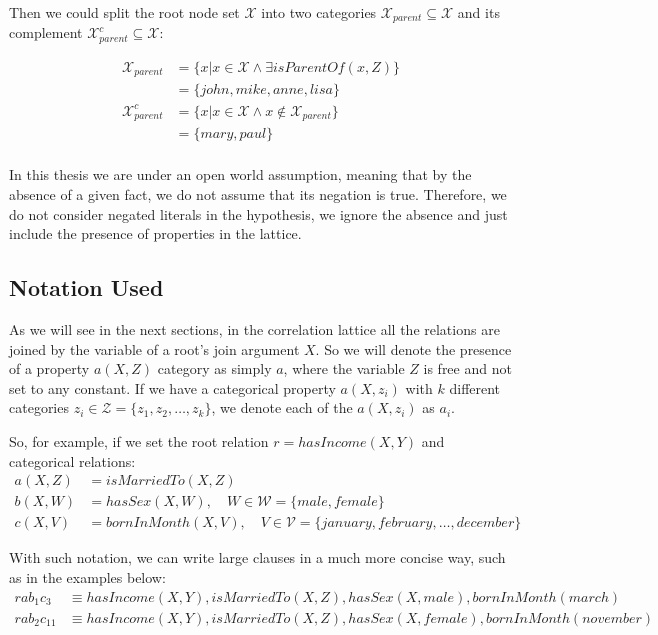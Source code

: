 Then we could split the root node set $\mathcal{X}$ into two categories $\mathcal{X}_{parent} \subseteq \mathcal{X}$
and its complement $\mathcal{X}_{parent}^{c} \subseteq \mathcal{X}$:

\begin{align*}
 \mathcal{X}_{parent}&=\{x| x \in \mathcal{X} \land \exists isParentOf(x,Z)\} \\
  &=\{john,mike,anne,lisa\} \\
 \mathcal{X}_{parent}^{c}&=\{x| x \in \mathcal{X} \land x \not \in \mathcal{X}_{parent} \} \\
  &=\{mary,paul\} \\
\end{align*}

In this thesis we are under an open world assumption, meaning that by the absence of a given fact, we do
not assume that its negation is true. Therefore, we do not consider negated literals in the hypothesis, we
ignore the absence and just include the presence of properties in the lattice.

\subsection{Notation Used}

As we will see in the next sections, in the correlation lattice all the relations are joined by the variable of
a root's join argument $X$. So we will denote the presence of a property $a(X,Z)$ category as simply $a$, where the
variable $Z$ is free and not set to any constant. If we have a categorical property $a(X,z_i)$ with $k$ different
categories $z_i \in \mathcal{Z}=\{ z_1,z_2,\ldots,z_k\}$, we denote each of the $a(X,z_i)$ as $a_i$.

So, for example, if we set the root relation $r=hasIncome(X,Y)$ and categorical relations:
\begin{align*}
a(X,Z)&=isMarriedTo(X,Z) \\
b(X,W)&=hasSex(X,W), \quad W \in \mathcal{W} =\{male,female\} \\
c(X,V)&=bornInMonth(X,V), \quad V \in \mathcal{V} =\{january,february,\ldots,december\}
\end{align*}

With such notation, we can write large clauses in a much more concise way, such as in the examples below:
\begin{align*}
rab_1c_3 &\equiv hasIncome(X,Y),isMarriedTo(X,Z),hasSex(X,male),bornInMonth(march) \\
rab_2c_{11} &\equiv hasIncome(X,Y),isMarriedTo(X,Z),hasSex(X,female),bornInMonth(november)
\end{align*}

